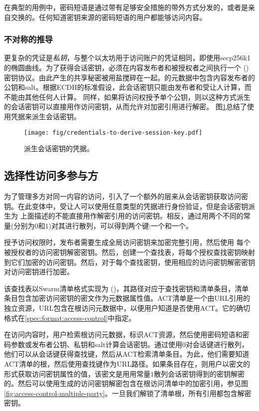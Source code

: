 在典型的用例中，密码短语是通过带有足够安全措施的带外方式分发的，或者是亲自交换的。任何知道密钥来源的密码短语的用户都能够访问内容。

\subsubsection{不对称的推导}

更复杂的凭证是\emph{私钥}，与整个以太坊用于访问账户的凭证相同，即使用secp256k1的椭圆曲线。为了获得会话密钥，必须在内容发布者和被授权者之间执行一个 ()密钥协议。由此产生的共享秘密被用盐搅碎在一起。的元数据中包含内容发布者的公钥和salt。根据ECDH的标准假设，此会话密钥只能由发布者和受让人计算，而不能由其他任何人计算。
同样，如果将访问权授予单个公钥，则以这种方式派生的会话密钥可以直接用作访问密钥，从而允许对加密引用进行解密。
图\ref{fig:credentials-to-derive-session-key}总结了使用凭据来派生会话密钥。

\begin{figure}[htbp]
\centering
\texttt{[image: fig/credentials-to-derive-session-key.pdf]}
\caption[派生会话密钥的凭据\statusyellow]{派生会话密钥的凭据。}
\label{fig:credentials-to-derive-session-key}
\end{figure}


\subsection{选择性访问多参与方\statusgreen}

为了管理多方对同一内容的访问，引入了一个额外的层来从会话密钥获取访问密钥。在此变体中，受让人可以使用任意类型的凭据进行身份验证，但是会话密钥派生为
上面描述的不能直接用作解密引用的访问密钥。相反，通过用两个不同的常量(分别为$0$和$1$)对其进行散列，可以得到两个键:一个和一个。

授予访问权限时，发布者需要生成全局访问密钥来加密完整引用，然后使用
每个被授权者的访问密钥解密密钥。然后，创建一个查找表，将每个授权查找密钥映射到它们加密的访问密钥。然后，对于每个查找密钥，使用相应的访问密钥解密密钥对访问密钥进行加密。

该查找表以Swarm清单格式实现为 ()，其路径对应于查找密钥和清单条目，清单条目包含加密访问密钥的密文作为元数据属性值。ACT清单是一个由URL引用的独立资源，URL包含在根访问元数据中，以便用户知道是否使用ACT。它的确切格式在\ref{spec:format:access-control}中指定。

在访问内容时，用户检索根访问元数据，标识ACT资源，然后使用密码短语和密码参数或发布者公钥、私钥和salt计算会话密钥。通过使用$0$对会话键进行散列，他们可以从会话键获得查找键，然后从ACT检索清单条目。为此，他们需要知道ACT清单的根，然后使用查找键作为URL路径。如果条目存在，则用户以密文的形式获取访问密钥属性的值，该密文是用用常量$1$散列会话密钥得到的密钥解密的。然后可以使用生成的访问密钥解密包含在根访问清单中的加密引用，参见图\ref{fig:access-control-multiple-party}。一旦我们解锁了清单根，所有引用都包含解密密钥。

